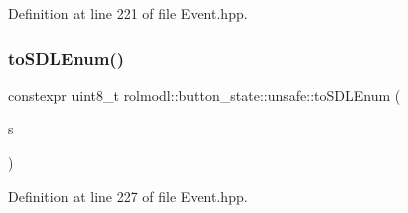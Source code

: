Definition at line 221 of file Event.\+hpp.

\mbox{\label{namespacerolmodl_1_1button__state_1_1unsafe_a715b8808fafb95acdf52ce45105892f8}} 
\subsubsection{\texorpdfstring{toSDLEnum()}{toSDLEnum()}}
{\footnotesize\ttfamily constexpr uint8\+\_\+t rolmodl\+::button\+\_\+state\+::unsafe\+::to\+S\+D\+L\+Enum (\begin{DoxyParamCaption}\item[{const \mbox{\hyperlink{namespacerolmodl_ad08ec5c56aa1db118f871357b2d475fd}{Button\+State}}}]{s }\end{DoxyParamCaption})\hspace{0.3cm}{\ttfamily [noexcept]}}



Definition at line 227 of file Event.\+hpp.

